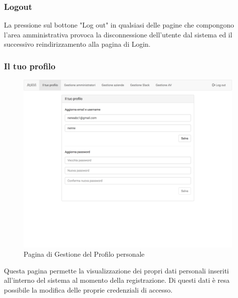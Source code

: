 \documentclass[../ManualeUtente_v1.0.0.tex]{subfiles}
\begin{document}
	\subsubsection{Logout}
	La pressione sul bottone "Log out" in qualsiasi delle pagine che compongono l'area amministrativa provoca la disconnessione dell'utente dal sistema ed il successivo reindirizzamento alla pagina di Login.
	
	\subsubsection{Il tuo profilo}
	\begin{figure}[!h]
		\centering
		\includegraphics[scale=0.15]{Screenshot/admin-manageProfile.png}
		\caption{Pagina di Gestione del Profilo personale}
	\end{figure}
	Questa pagina permette la visualizzazione dei propri dati personali inseriti all'interno del sistema al momento della registrazione. Di questi dati è resa possibile la modifica delle proprie credenziali di accesso.
	
	\newpage
\end{document}
